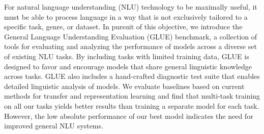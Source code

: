 For natural language understanding (NLU) technology to be maximally useful, it must be able to process language in a way that is not exclusively tailored to a specific task, genre, or dataset. In pursuit of this objective, we introduce the General Language Understanding Evaluation (GLUE) benchmark, a collection of tools for evaluating and analyzing the performance of models across a diverse set of existing NLU tasks. By including tasks with limited training data, GLUE is designed to favor and encourage models that share general linguistic knowledge across tasks. GLUE also includes a hand-crafted diagnostic test suite that enables detailed linguistic analysis of models. We evaluate baselines based on current methods for transfer and representation learning and find that multi-task training on all our tasks yields better results than training a separate model for each task. However, the low absolute performance of our best model indicates the need for improved general NLU systems.
